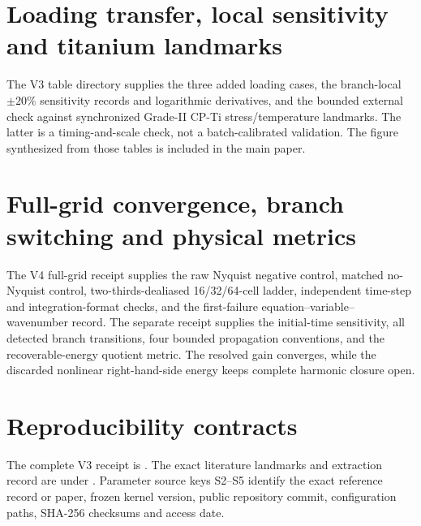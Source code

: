 \documentclass[preprint,12pt]{elsarticle}
\begin{document}
\section{Loading transfer, local sensitivity and titanium landmarks}

The V3 table directory supplies the three added loading cases, the
branch-local $\pm20\%$ sensitivity records and logarithmic derivatives, and
the bounded external check against synchronized Grade-II CP-Ti
stress/temperature landmarks.  The latter is a timing-and-scale check, not a
batch-calibrated validation.  The figure synthesized from those tables is
included in the main paper.

\section{Full-grid convergence, branch switching and physical metrics}

The V4 full-grid receipt
 supplies the
raw Nyquist negative control, matched no-Nyquist control, two-thirds-dealiased
16/32/64-cell ladder, independent time-step and integration-format checks,
and the first-failure equation--variable--wavenumber record.  The separate
receipt  supplies
the initial-time sensitivity, all detected branch transitions, four bounded
propagation conventions, and the recoverable-energy quotient metric.  The
resolved gain converges, while the discarded nonlinear right-hand-side energy
keeps complete harmonic closure open.

\section{Reproducibility contracts}

The complete V3 receipt is
.  The exact literature
landmarks and extraction record are under
.  Parameter
source keys S2--S5 identify the exact reference record or paper, frozen kernel
version, public repository commit, configuration paths, SHA-256 checksums and
access date.
\end{document}
